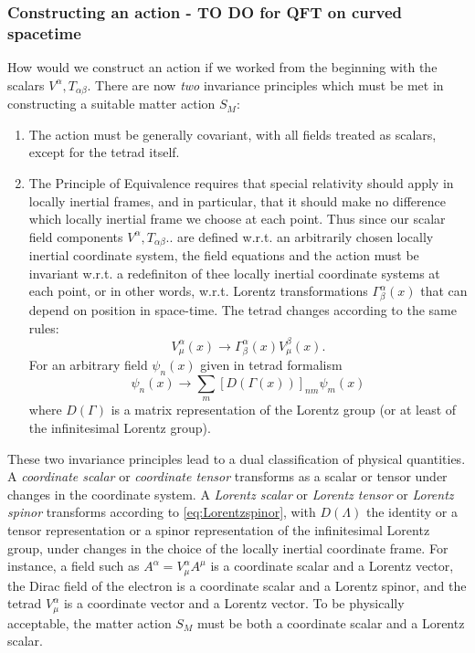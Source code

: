\subsubsection{Constructing an action - TO DO for QFT on curved spacetime }
How would we construct an action if we worked from the beginning with the scalars $V^\alpha,T_{\alpha\beta}$. There are now \emph{two} invariance principles which must be met in constructing a suitable matter action $S_M$:
\begin{enumerate}
	\item The action must be generally covariant, with all fields treated as scalars, except for the tetrad itself.
	\item The Principle of Equivalence requires that special relativity should apply in locally inertial frames, and in particular, that it should make no difference which locally inertial frame we choose at each point. Thus since our scalar field components $V^\alpha,T_{\alpha \beta}..$ are defined w.r.t. an arbitrarily chosen locally inertial coordinate system, the field equations and the action must be invariant w.r.t. a redefiniton of thee locally inertial coordinate systems at each point, or in other words, w.r.t. Lorentz transformations $\Gamma^\alpha_\beta(x)$ that can depend on position in space-time. The tetrad changes according to the same rules:
	\begin{equation}
		V^\alpha_\mu(x)\rightarrow\Gamma^\alpha_\beta(x) V^\beta_\mu(x).
	\end{equation}
	For an arbitrary field $\psi_n(x)$ given in tetrad formalism
	\begin{equation}
	\label{eq:Lorentzspinor}
		\psi_n(x) \rightarrow \sum_m [D(\Gamma(x))]_{nm} \psi_m(x)
	\end{equation}
	where $D(\Gamma)$ is a matrix representation of the Lorentz group (or at least of the infinitesimal Lorentz group).
\end{enumerate}
These two invariance principles lead to a dual classification of physical quantities. A \emph{coordinate scalar} or \emph{coordinate tensor} transforms as a scalar or tensor under changes in the coordinate system. A \emph{Lorentz scalar} or \emph{Lorentz tensor} or \emph{Lorentz spinor} transforms according to \ref{eq:Lorentzspinor}, with $D(\Lambda)$ the identity or a tensor representation or a spinor representation of the infinitesimal Lorentz group, under changes in the choice of the locally inertial coordinate frame. For instance, a field such as $A^\alpha = V^\alpha_\mu A^\mu$ is a coordinate scalar and a Lorentz vector, the Dirac field of the electron is a coordinate scalar and a Lorentz spinor, and the tetrad $V^\alpha_\mu$ is a coordinate vector and a Lorentz vector. To be physically acceptable, the matter action $S_M$ must be both a coordinate scalar and a Lorentz scalar.\\
